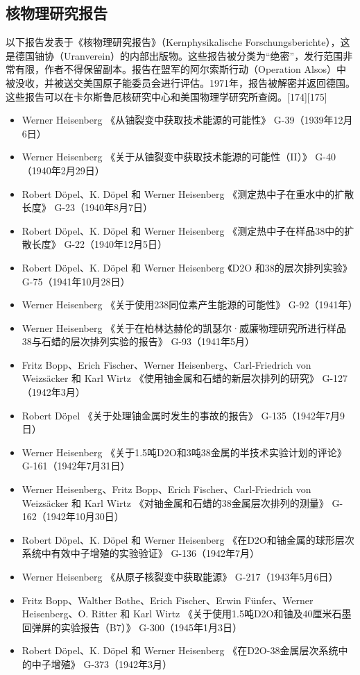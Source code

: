 \subsection{核物理研究报告}  
以下报告发表于《核物理研究报告》（Kernphysikalische Forschungsberichte），这是德国铀协（Uranverein）的内部出版物。这些报告被分类为“绝密”，发行范围非常有限，作者不得保留副本。报告在盟军的阿尔索斯行动（Operation Alsos）中被没收，并被送交美国原子能委员会进行评估。1971年，报告被解密并返回德国。这些报告可以在卡尔斯鲁厄核研究中心和美国物理学研究所查阅。[174][175]
\begin{itemize}
\item Werner Heisenberg 《从铀裂变中获取技术能源的可能性》 G-39（1939年12月6日）  
\item Werner Heisenberg 《关于从铀裂变中获取技术能源的可能性（II）》 G-40（1940年2月29日）  
\item Robert Döpel、K. Döpel 和 Werner Heisenberg 《测定热中子在重水中的扩散长度》 G-23（1940年8月7日）  
\item Robert Döpel、K. Döpel 和 Werner Heisenberg 《测定热中子在样品38中的扩散长度》 G-22（1940年12月5日）  
\item Robert Döpel、K. Döpel 和 Werner Heisenberg 《D2O 和38的层次排列实验》 G-75（1941年10月28日）  
\item Werner Heisenberg 《关于使用238同位素产生能源的可能性》 G-92（1941年）  
\item Werner Heisenberg 《关于在柏林达赫伦的凯瑟尔·威廉物理研究所进行样品38与石蜡的层次排列实验的报告》 G-93（1941年5月）  
\item Fritz Bopp、Erich Fischer、Werner Heisenberg、Carl-Friedrich von Weizsäcker 和 Karl Wirtz 《使用铀金属和石蜡的新层次排列的研究》 G-127（1942年3月）  
\item Robert Döpel 《关于处理铀金属时发生的事故的报告》 G-135（1942年7月9日）  
\item Werner Heisenberg 《关于1.5吨D2O和3吨38金属的半技术实验计划的评论》 G-161（1942年7月31日）  
\item Werner Heisenberg、Fritz Bopp、Erich Fischer、Carl-Friedrich von Weizsäcker 和 Karl Wirtz 《对铀金属和石蜡的38金属层次排列的测量》 G-162（1942年10月30日）  
\item Robert Döpel、K. Döpel 和 Werner Heisenberg 《在D2O和铀金属的球形层次系统中有效中子增殖的实验验证》 G-136（1942年7月）  
\item Werner Heisenberg 《从原子核裂变中获取能源》 G-217（1943年5月6日）  
\item Fritz Bopp、Walther Bothe、Erich Fischer、Erwin Fünfer、Werner Heisenberg、O. Ritter 和 Karl Wirtz 《关于使用1.5吨D2O和铀及40厘米石墨回弹屏的实验报告（B7）》 G-300（1945年1月3日）  
\item Robert Döpel、K. Döpel 和 Werner Heisenberg 《在D2O-38金属层次系统中的中子增殖》 G-373（1942年3月）
\end{itemize}
